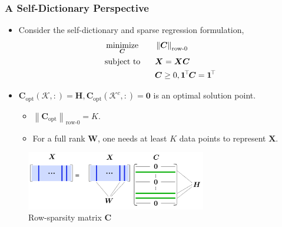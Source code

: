 \documentclass[10pt,xcolor={usenames,dvipsnames,table}]{beamer}
\def\blue{\color{blue}}
\newcommand{\norm}[1]{\left\lVert#1\right\rVert}
\newcommand{\T}{\!\top\!}
\DeclareMathOperator*{\minimize}{minimize}
\newcommand{\citep}[1]{{\blue \scriptsize \parencite{#1}}}
\begin{document}
\begin{frame}
    \frametitle{A Self-Dictionary Perspective}

    \begin{itemize}
        \item Consider the self-dictionary and sparse regression formulation,
            \citep{iordache2014collaborative,esser2012convex,recht2012factoring,Elhamifar2012}
    \begin{alignat*}{2}
        & \minimize_{\bm{C}} \quad && \norm{\bm{C}}_{\text{row-}0}  \\
        & \text{\rm subject to} && \bm{X} = \bm{X} \bm{C} \\
        &&& \bm{C} \geq 0, \bm{1}^{\T}\bm{C} = \bm{1}^{\T}
    \end{alignat*}

        \item $\bm{C}_{\text{opt}}(\mathcal{K}, :) = \bm{H}, \bm{C}_{\text{opt}}(\mathcal{K}^{c}, :) = \bm{0}$ is an optimal solution point.
        \begin{itemize}
        \item $\norm{\bm{C}_\text{opt}}_{\text{row-}0} = K$.
        \item For a full rank $\bm{W}$, one needs at least $K$ data points to represent $\bm{X}$.
        \end{itemize}
    \end{itemize}

    \begin{figure}
        \centering
        \includegraphics[width=0.7\textwidth]{figures/sdmmv_demo/demo.png}
        \caption*{Row-sparsity matrix $\bm{C}$ }
    \end{figure}


\end{frame}
\end{document}
